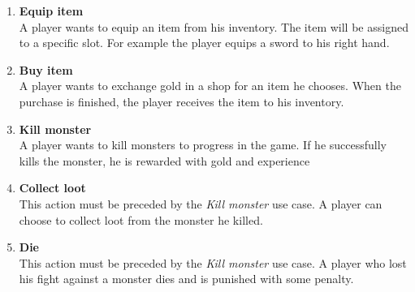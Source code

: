 		\begin{enumerate}
			\item \textbf{Equip item} \\
			A player wants to equip an item from his inventory. The item will be assigned to a specific slot. For example the player equips a sword to his right hand.
			
			\item \textbf{Buy item} \\
			A player wants to exchange gold in a shop for an item he chooses. When the purchase is finished, the player receives the item to his inventory.
			
			\item \textbf{Kill monster} \\
			A player wants to kill monsters to progress in the game. If he successfully kills the monster, he is rewarded with gold and experience
			
			\item \textbf{Collect loot} \\
			This action must be preceded by the \textit{Kill monster} use case. A player can choose to collect loot from the monster he killed.
			
			\item \textbf{Die} \\
			This action must be preceded by the \textit{Kill monster} use case. A player who lost his fight against a monster dies and is punished with some penalty.		
		\end{enumerate}
	
